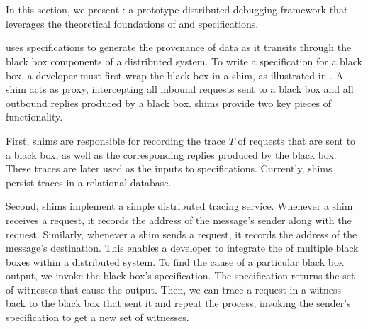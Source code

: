 \section{\fluent{}}
In this section, we present \fluent{}: a prototype distributed debugging
framework that leverages the theoretical foundations of \watprovenance{} and
\watprovenance{} specifications.
%

{}

\fluent{} uses \watprovenance{} specifications to generate the provenance of
data as it transits through the black box components of a distributed system.
To write a \watprovenance{} specification for a black box, a developer must
first wrap the black box in a \fluent{} shim, as illustrated in
. A shim acts as proxy, intercepting all inbound requests
sent to a black box and all outbound replies produced by a black box. \fluent{}
shims provide two key pieces of functionality.

First, \fluent{} shims are responsible for recording the trace $T$ of requests
that are sent to a black box, as well as the corresponding replies produced by
the black box. These traces are later used as the inputs to \watprovenance{}
specifications.  Currently, \fluent{} shims persist traces in a relational
database.

Second, \fluent{} shims implement a simple distributed tracing service.
Whenever a \fluent{} shim receives a request, it records the address of the
message's sender along with the request. Similarly, whenever a \fluent{}
shim sends a request, it records the address of the message's
destination.
%
This enables a developer to integrate the \watprovenance{} of multiple black
boxes within a distributed system. To find the cause of a particular black box
output, we invoke the black box's \watprovenance{} specification.  The
specification returns the set of witnesses that cause the output. Then, we can
trace a request in a witness back to the black box that sent it and repeat the
process, invoking the sender's \watprovenance{} specification to get a new set
of witnesses.

